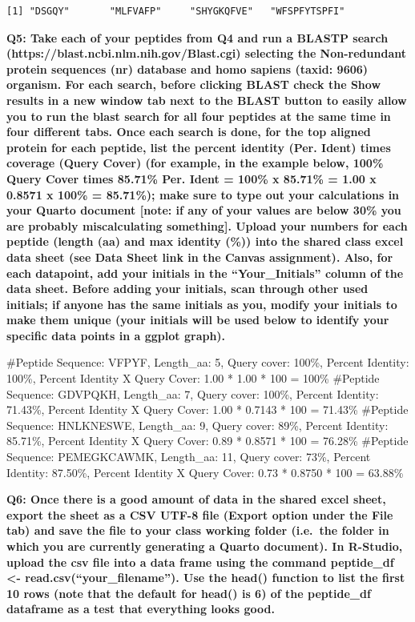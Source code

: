 \documentclass[
  letterpaper,
  DIV=11,
  numbers=noendperiod]{scrartcl}
\newenvironment{Shaded}{\begin{snugshade}}{\end{snugshade}}
\newcommand{\CommentTok}[1]{\textcolor[rgb]{0.37,0.37,0.37}{#1}}
\begin{document}
\begin{verbatim}
[1] "DSGQY"       "MLFVAFP"     "SHYGKQFVE"   "WFSPFYTSPFI"
\end{verbatim}

\textbf{Q5: Take each of your peptides from Q4 and run a BLASTP search
(https://blast.ncbi.nlm.nih.gov/Blast.cgi) selecting the Non-redundant
protein sequences (nr) database and homo sapiens (taxid: 9606) organism.
For each search, before clicking BLAST check the Show results in a new
window tab next to the BLAST button to easily allow you to run the blast
search for all four peptides at the same time in four different tabs.
Once each search is done, for the top aligned protein for each peptide,
list the percent identity (Per. Ident) times coverage (Query Cover) (for
example, in the example below, 100\% Query Cover times 85.71\% Per.
Ident = 100\% x 85.71\% = 1.00 x 0.8571 x 100\% = 85.71\%); make sure to
type out your calculations in your Quarto document {[}note: if any of
your values are below 30\% you are probably miscalculating something{]}.
Upload your numbers for each peptide (length (aa) and max identity (\%))
into the shared class excel data sheet (see Data Sheet link in the
Canvas assignment). Also, for each datapoint, add your initials in the
``Your\_Initials'' column of the data sheet. Before adding your
initials, scan through other used initials; if anyone has the same
initials as you, modify your initials to make them unique (your initials
will be used below to identify your specific data points in a ggplot
graph).}

\begin{Shaded}
\begin{Highlighting}[]
\CommentTok{\#Peptide Sequence: VFPYF, Length\_aa: 5, Query cover: 100\%, Percent Identity: 100\%, Percent Identity X Query Cover: 1.00 * 1.00 * 100 = 100\%}
\CommentTok{\#Peptide Sequence: GDVPQKH, Length\_aa: 7, Query cover: 100\%, Percent Identity: 71.43\%, Percent Identity X Query Cover: 1.00 * 0.7143 * 100 = 71.43\%}
\CommentTok{\#Peptide Sequence: HNLKNESWE, Length\_aa: 9, Query cover: 89\%, Percent Identity: 85.71\%, Percent Identity X Query Cover: 0.89 * 0.8571 * 100 = 76.28\%}
\CommentTok{\#Peptide Sequence: PEMEGKCAWMK, Length\_aa: 11, Query cover: 73\%, Percent Identity: 87.50\%, Percent Identity X Query Cover: 0.73 * 0.8750 * 100 = 63.88\%}
\end{Highlighting}
\end{Shaded}

\textbf{Q6: Once there is a good amount of data in the shared excel
sheet, export the sheet as a CSV UTF-8 file (Export option under the
File tab) and save the file to your class working folder (i.e.~the
folder in which you are currently generating a Quarto document). In
R-Studio, upload the csv file into a data frame using the command
peptide\_df \textless- read.csv(``your\_filename''). Use the head()
function to list the first 10 rows (note that the default for head() is
6) of the peptide\_df dataframe as a test that everything looks good.}
\end{document}
